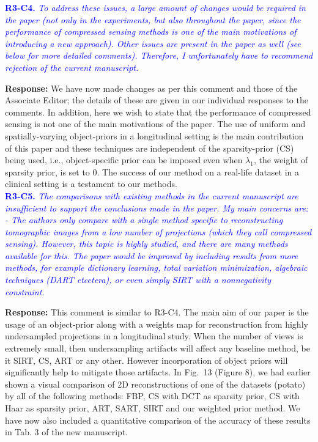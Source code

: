 \documentclass{article}
\begin{document}
\textcolor{blue}{\textbf{R3-C4.}\textit{ To address these issues, a large amount of changes would be required in the paper (not only in the experiments, but also throughout the paper, since the performance of compressed sensing methods is one of the main motivations of introducing a new approach). Other issues are present in the paper as well (see below for more detailed comments). Therefore, I unfortunately have to recommend rejection of the current manuscript.}}

\textbf{Response:} We have now made changes as per this comment and those of the Associate Editor; the details of these are given in our individual responses to the comments. In addition, here we wish to state that the performance of compressed sensing is not one of the main motivations of the paper. The use of uniform and spatially-varying object-priors in a longitudinal setting is the main contribution of this paper and these techniques are independent of the sparsity-prior (CS) being used, i.e., object-specific prior can be imposed even when $\lambda_1$, the weight of sparsity prior, is set to $0$.  The success of our method on a real-life dataset in a clinical setting is a testament to our methods.\\


\textcolor{blue}{\textbf{R3-C5.}\textit{ The comparisons with existing methods in the current manuscript are insufficient to support the conclusions made in the paper. My main concerns are: - The authors only compare with a single method specific to reconstructing tomographic images from a low number of projections (which they call compressed sensing). However, this topic is highly studied, and there are many methods available for this. The paper would be improved by including results from more methods, for example dictionary learning, total variation minimization, algebraic techniques (DART etcetera), or even simply SIRT with a nonnegativity constraint.}}

\textbf{Response:} This comment is similar to R3-C4. The main aim of our paper is the usage of an object-prior along with a weights map for reconstruction from highly undersampled projections in a longitudinal study. When the number of views is extremely small, then undersampling artifacts will affect any baseline method, be it SIRT, CS, ART or any other. However incorporation of object priors will significantly help to mitigate those artifacts.
In Fig.~13 (Figure 8), we had earlier shown a visual comparison of 2D reconstructions of one of the datasets (potato) by all of the following methods: FBP, CS with DCT as sparsity prior, CS with Haar as sparsity prior, ART, SART, SIRT and our weighted prior method.
We have now also included a quantitative comparison of the accuracy of these results in Tab. 3 of the new manuscript.\\
\end{document}
